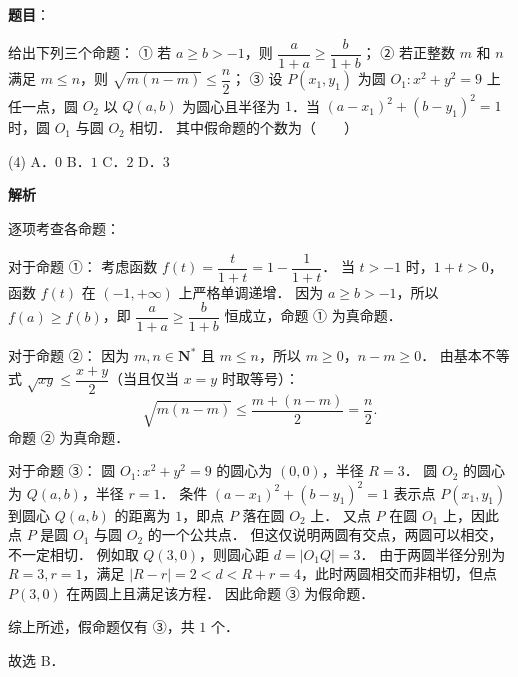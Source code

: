 \begin{answer}

\textbf{题目}：

给出下列三个命题：
① 若 $a \geqslant b > -1$，则 $\dfrac{a}{1+a} \geqslant \dfrac{b}{1+b}$；
② 若正整数 $m$ 和 $n$ 满足 $m \leqslant n$，则 $\sqrt{m(n-m)} \leqslant \dfrac{n}{2}$；
③ 设 $P(x_1, y_1)$ 为圆 $O_1: x^2 + y^2 = 9$ 上任一点，圆 $O_2$ 以 $Q(a, b)$ 为圆心且半径为 $1$．当 $(a - x_1)^2 + (b - y_1)^2 = 1$ 时，圆 $O_1$ 与圆 $O_2$ 相切．
其中假命题的个数为\mbox{（　　）}

\begin{gkopts}(4)
\task A．$0$
\task B．$1$
\task C．$2$
\task D．$3$
\end{gkopts}

\textbf{解析}

逐项考查各命题：

对于命题 ①：
考虑函数 $f(t) = \dfrac{t}{1+t} = 1 - \dfrac{1}{1+t}$．
当 $t > -1$ 时，$1+t > 0$，函数 $f(t)$ 在 $(-1, +\infty)$ 上严格单调递增．
因为 $a \geqslant b > -1$，所以 $f(a) \geqslant f(b)$，即 $\dfrac{a}{1+a} \geqslant \dfrac{b}{1+b}$ 恒成立，命题 ① 为真命题．

对于命题 ②：
因为 $m, n \in \mathbf{N}^*$ 且 $m \leqslant n$，所以 $m \geqslant 0$，$n - m \geqslant 0$．
由基本不等式 $\sqrt{xy} \leqslant \dfrac{x+y}{2}$（当且仅当 $x = y$ 时取等号）：
\nopagebreak[4]
\[
\sqrt{m(n-m)} \leqslant \dfrac{m + (n-m)}{2} = \dfrac{n}{2}.
\]
命题 ② 为真命题．

对于命题 ③：
圆 $O_1: x^2 + y^2 = 9$ 的圆心为 $(0, 0)$，半径 $R = 3$．
圆 $O_2$ 的圆心为 $Q(a, b)$，半径 $r = 1$．
条件 $(a - x_1)^2 + (b - y_1)^2 = 1$ 表示点 $P(x_1, y_1)$ 到圆心 $Q(a, b)$ 的距离为 $1$，即点 $P$ 落在圆 $O_2$ 上．
又点 $P$ 在圆 $O_1$ 上，因此点 $P$ 是圆 $O_1$ 与圆 $O_2$ 的一个公共点．
但这仅说明两圆有交点，两圆可以相交，不一定相切．
例如取 $Q(3, 0)$，则圆心距 $d = |O_1Q| = 3$．
由于两圆半径分别为 $R = 3, r = 1$，满足 $|R - r| = 2 < d < R + r = 4$，此时两圆相交而非相切，但点 $P(3, 0)$ 在两圆上且满足该方程．
因此命题 ③ 为假命题．

综上所述，假命题仅有 ③，共 $1$ 个．

故选 B．


\end{answer}
